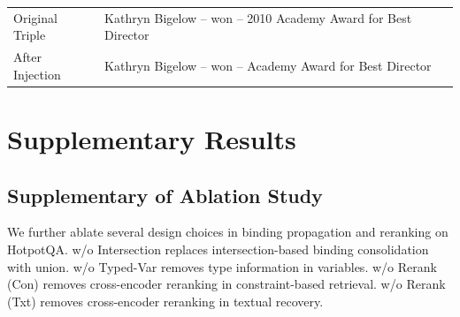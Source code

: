\documentclass{article}
\theoremstyle{plain}
\theoremstyle{definition}
\theoremstyle{remark}
\begin{document}
\begin{itemize}
\begin{itemize}
        \begin{center}
        \begin{tabular}{ll}
        \toprule
        Original Triple & \small Kathryn Bigelow -- won -- 2010 Academy Award for Best Director \\
        After Injection & \small Kathryn Bigelow -- won -- Academy Award for Best Director \\
        \bottomrule
        \end{tabular}
        \end{center}
    \end{itemize}
\end{itemize}

\section{Supplementary Results}
\label{Supplementary Results}


\subsection{Supplementary of Ablation Study}
\label{appsec:ablation}

We further ablate several design choices in binding propagation and reranking on HotpotQA. 
w/o Intersection replaces intersection-based binding consolidation with union. 
w/o Typed-Var removes type information in variables. 
w/o Rerank (Con) removes cross-encoder reranking in constraint-based retrieval. 
w/o Rerank (Txt) removes cross-encoder reranking in textual recovery. 

\begin{table}[h]
    \centering
    \small
    \setlength{\tabcolsep}{3pt}
    \caption{Supplementary ablation results of EM (\%) and F1 (\%) under different builders on HotpotQA.}
    \label{tab:ablation_supp}
\end{table}
\end{document}
